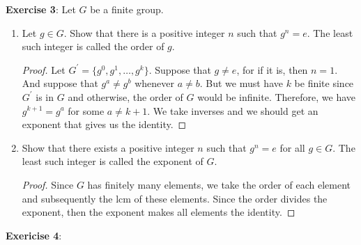 \documentclass{article}
\begin{document}
\textbf{Exercise 3}: Let $G$ be a finite group.
\begin{enumerate}
	\item Let $g \in G$. Show that there is a positive integer $n$ such that $g^{n} = e$. The least such integer is called the order of $g$.

	\begin{proof}
		Let $G^{\prime} = \{g^{0}, g^{1}, \ldots, g^{k}\}$. Suppose that $g \neq e$, for if it is, then $n = 1$. And suppose that $g^{a} \neq g^{b}$ whenever $a \neq b$. But we must have $k$ be finite since $G^{\prime}$ is in $G$ and otherwise, the order of $G$ would be infinite. Therefore, we have $g^{k + 1} = g^{a}$ for some $a \neq k + 1$. We take inverses and we should get an exponent that gives us the identity.
	\end{proof}

	\item Show that there exists a positive integer $n$ such that $g^{n} = e$ for all $g \in G$. The least such integer is called the exponent of $G$.

	\begin{proof}
		Since $G$ has finitely many elements, we take the order of each element and subsequently the lcm of these elements. Since the order divides the exponent, then the exponent makes all elements the identity.
	\end{proof}
\end{enumerate}
\textbf{Exericise 4}:
\end{document}
